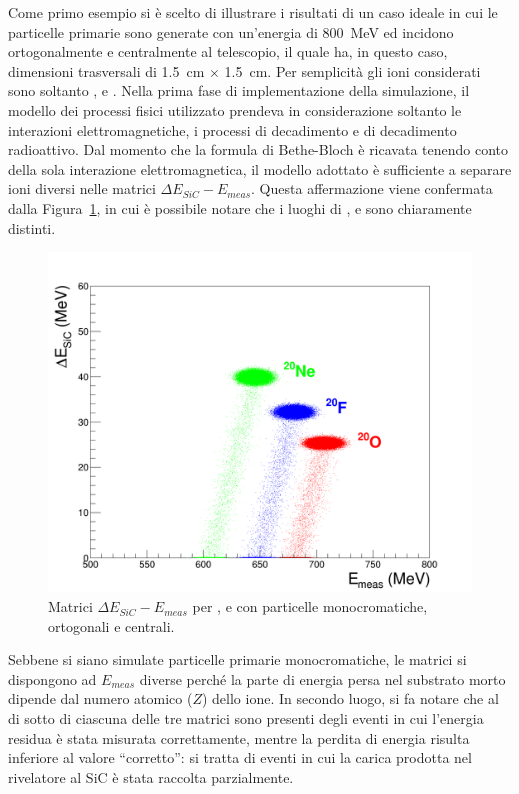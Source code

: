 Come primo esempio si è scelto di illustrare i risultati di un caso ideale in cui le particelle primarie sono generate con un'energia di 800~MeV ed incidono ortogonalmente e centralmente al telescopio, il quale ha, in questo caso, dimensioni trasversali di 1.5~cm $\times$ 1.5~cm.
Per semplicità gli ioni considerati sono soltanto ,  e .
Nella prima fase di implementazione della simulazione, il modello dei processi fisici utilizzato prendeva in considerazione soltanto le interazioni elettromagnetiche, i processi di decadimento e di decadimento radioattivo.
Dal momento che la formula di Bethe-Bloch è ricavata tenendo conto della sola interazione elettromagnetica, il modello adottato è sufficiente a separare ioni diversi nelle matrici $\Delta E_{SiC} - E_{meas}$.
Questa affermazione viene confermata dalla Figura~\ref{fig:deltaE_ETot}, in cui è possibile notare che i luoghi di ,  e  sono chiaramente distinti.
\begin{figure} [!t]
	\centering
	\includegraphics[width=\textwidth, keepaspectratio]{Grafici_Tesi2/Particelle_monocromatiche/deltaE_ETot_quadrata.png}
	\caption{Matrici $\Delta E_{SiC} - E_{meas}$ per ,  e  con particelle monocromatiche, ortogonali e centrali.} \label{fig:deltaE_ETot}
\end{figure}
Sebbene si siano simulate particelle primarie monocromatiche, le matrici si dispongono ad $E_{meas}$ diverse perché la parte di energia persa nel substrato morto dipende dal numero atomico ($Z$) dello ione.
In secondo luogo, si fa notare che al di sotto di ciascuna delle tre matrici sono presenti degli eventi in cui l'energia residua è stata misurata correttamente, mentre la perdita di energia risulta inferiore al valore ``corretto'': si tratta di eventi in cui la carica prodotta nel rivelatore al SiC è stata raccolta parzialmente. 
